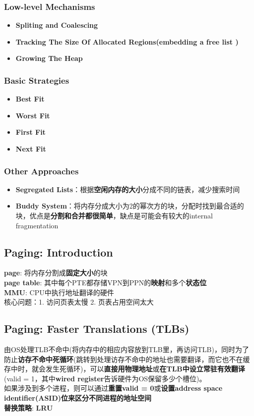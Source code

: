 \documentclass{article}
\begin{document}
\subsubsection{Low-level Mechanisms}
\begin{itemize}
    \item \textbf{Spliting and Coalescing}
    \item \textbf{Tracking The Size Of Allocated Regions(embedding a free list )}
    \item \textbf{Growing The Heap}
\end{itemize}


\subsubsection{Basic Strategies}
\begin{itemize}
    \item \textbf{Best Fit}
    \item \textbf{Worst Fit}
    \item \textbf{First Fit}
    \item \textbf{Next Fit}
    
\end{itemize}
\subsubsection{Other Approaches}
\begin{itemize}
    \item \textbf{Segregated Lists}：根据\textbf{空闲内存的大小}分成不同的链表，减少搜索时间
    \item \textbf{Buddy System}：将内存分成大小为2的幂次方的块，分配时找到最合适的块，优点是\textbf{分割和合并都很简单}，缺点是可能会有较大的internal fragmentation
\end{itemize}

\subsection{Paging: Introduction}
\textbf{page}: 将内存分割成\textbf{固定大小}的块 \\
\indent \textbf{page table}: 其中每个PTE都存储VPN到PPN的\textbf{映射}和多个\textbf{状态位} \\
\indent \textbf{MMU}: CPU中执行地址翻译的硬件 \\
\indent 核心问题：1. 访问页表太慢 2. 页表占用空间太大

\subsection{Paging: Faster Translations (TLBs)}
由OS处理TLB不命中(将内存中的相应内容放到TLB里，再访问TLB)，同时为了防止\textbf{访存不命中死循环}(跳转到处理访存不命中的地址也需要翻译，而它也不在缓存中时，就会发生死循环)，可以\textbf{直接用物理地址}或\textbf{在TLB中设立常驻有效翻译}(valid = 1，其中\textbf{wired register}告诉硬件为OS保留多少个槽位)。\\
\indent 如果涉及到多个进程，则可以通过\textbf{重置valid = 0}或\textbf{设置address space identifier(ASID)位来区分不同进程的地址空间} \\
\indent \textbf{替换策略}: \textbf{LRU}
\end{document}
